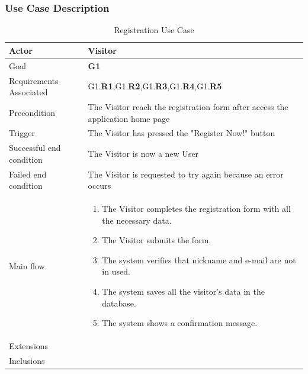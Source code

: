 \subsubsection{Use Case Description}
\newline
\begin{table}[htb]
\begin{center}
\renewcommand{\arraystretch}{1.5}
\begin{tabular}{|l|p{}|}
\hline
Actor & Visitor \\ \hline
Goal & \textbf{G1} \\ \hline
Requirements Associated & G1.\textbf{R1},G1.\textbf{R2},G1.\textbf{R3},G1.\textbf{R4},G1.\textbf{R5} \\ \hline
Precondition & The Visitor reach the registration form after access the application home page \\ \hline
Trigger & The Visitor has pressed the "Register Now!" button \\ \hline
Successful end condition & The Visitor is now a new User \\ \hline
Failed end condition & The Visitor is requested to try again because an error occurs \\ \hline
Main flow & \begin{minipage}[t]{0.6\textwidth}
\begin{enumerate}
\addtolength{\itemindent}{0.5cm}
\item The Visitor completes the registration form with all the necessary data.
\item The Visitor submits the form.
\item The system verifies that nickname and e-mail are not in used.
\item The system saves all the visitor's data in the database.
\item The system shows a confirmation message.
\end{enumerate}
\end{minipage} \\ \hline
Extensions & \\ \hline
Inclusions & \\ \hline
\end{tabular}
\caption{Registration Use Case}
\end{center}
\end{table}
\clearpage

